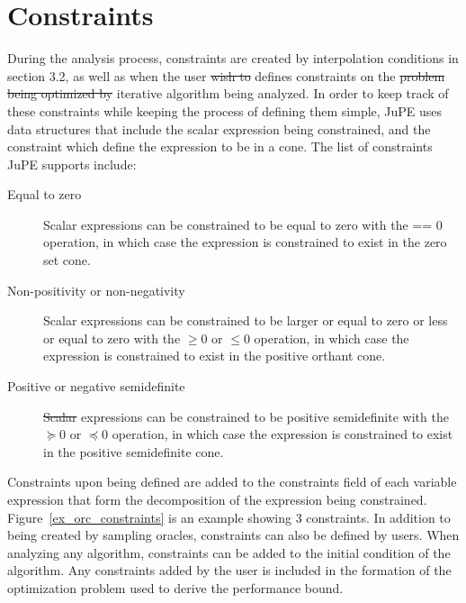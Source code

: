 
\section{Constraints}
During the analysis process, constraints are created by interpolation conditions in section 3.2, as well as when the user \sout{wish to} defines constraints on the \sout{problem being optimized by} iterative algorithm being analyzed. In order to keep track of these constraints while keeping the process of defining them simple, JuPE uses data structures that include the scalar expression being constrained, and the constraint which define the expression to be in a cone. The list of constraints JuPE supports include:

\begin{description}
	\item[Equal to zero] Scalar expressions can be constrained to be equal to zero with the == 0 operation, in which case the expression is constrained to exist in the zero set cone.
	\item[Non-positivity or non-negativity] Scalar expressions can be constrained to be larger or equal to zero or less or equal to zero with the $\geq 0$ or $\leq 0$ operation, in which case the expression is constrained to exist in the positive orthant cone.
	\item[Positive or negative semidefinite] \sout{Scalar}  expressions can be constrained to be positive semidefinite with the $\succeq 0$ or $\preceq 0$ operation, in which case the expression is constrained to exist in the positive semidefinite cone.
\end{description}

Constraints upon being defined are added to the constraints  field of each variable expression that form the decomposition of the expression being constrained. Figure~\ref{ex_orc_constraints} is an example showing 3 constraints. In addition to being created by sampling oracles, constraints can also be defined by users. When analyzing any algorithm, constraints can be added to the initial condition of the algorithm. Any constraints added by the user is included in the formation of the optimization problem used to derive the performance bound.

